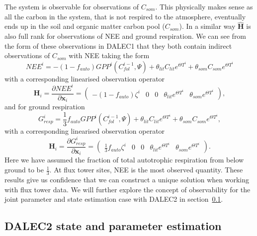 The system is observable for observations of $C_{som}$. This physically makes sense as all the carbon in the system, that is not respired to the atmosphere, eventually ends up in the soil and organic matter carbon pool ($C_{som}$). In a similar way $\hat{\textbf{H}}$ is also full rank for observations of NEE and ground respiration. We can see from the form of these observations in DALEC1 that they both contain indirect observations of $C_{som}$ with NEE taking the form
\begin{equation}
NEE^{i}=-(1-f_{auto})GPP^{i}(C_{fol}^{i-1}, \Psi) + \theta_{lit}C_{lit} e^{\Theta T^{i}} + \theta_{som}C_{som} e^{\Theta T^{i}} \label{chap5:eqn: D1_nee}
\end{equation}
with a corresponding linearised observation operator
\begin{equation}
\textbf{H}_{i} = \frac{\partial NEE^{i}}{\partial \textbf{x}_{i}} =
\begin{pmatrix}
-(1-f_{auto})\zeta^i & 0 & 0 & \theta_{lit} e^{\Theta T^{i}} & \theta_{som} e^{\Theta T^{i}}
\end{pmatrix},
\end{equation}
and for ground respiration
\begin{equation}
G_{resp}^{i}=\frac{1}{3}f_{auto}GPP^{i}(C_{fol}^{i-1}, \Psi) + \theta_{lit}C_{lit} e^{\Theta T^{i}} + \theta_{som}C_{som} e^{\Theta T^{i}}, \label{chap5:neeeqn}
\end{equation}
with a corresponding linearised observation operator
\begin{equation}
\textbf{H}_{i} = \frac{\partial G_{resp}^{i}}{\partial \textbf{x}_{i}} =
\begin{pmatrix}
\frac{1}{3}f_{auto}\zeta^i & 0 & 0 & \theta_{lit} e^{\Theta T^{i}} & \theta_{som} e^{\Theta T^{i}}
\end{pmatrix}.
\end{equation}
Here we have assumed the fraction of total autotrophic respiration from below ground to be $\frac{1}{3}$. At flux tower sites, NEE is the most observed quantity. These results give us confidence that we can construct a unique solution when working with flux tower data. We will further explore the concept of observability for the joint parameter and state estimation case with DALEC2 in section~\ref{chap5:sec: D2_observability}. 

\subsection{DALEC2 state and parameter estimation} \label{chap5:sec: D2_observability}

